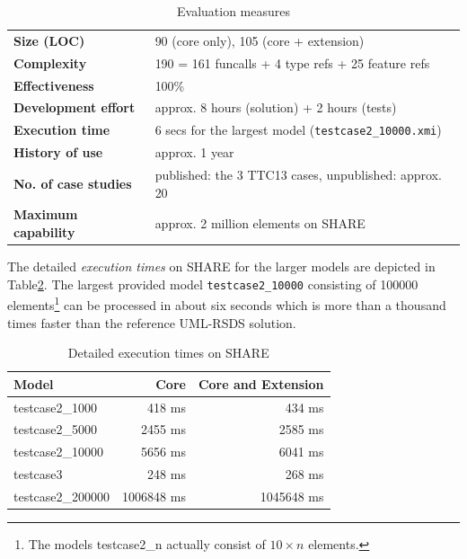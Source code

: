 \documentclass[submission]{eptcs}
\begin{document}
\begin{table}[htb]
  \footnotesize
  \centering
  \begin{tabular}{| l | l |}
    \hline
    \textbf{Size (LOC)}         & 90 (core only), 105 (core + extension)\\
    \textbf{Complexity}         & 190 = 161 funcalls + 4 type refs + 25 feature refs\\
    \textbf{Effectiveness}      & 100\%\\
    \textbf{Development effort} & approx. 8 hours (solution) + 2 hours (tests)\\
    \textbf{Execution time}     & 6 secs for the largest model (\verb|testcase2_10000.xmi|)\\
    \textbf{History of use}     & approx. 1 year\\
    \textbf{No. of case studies}& published: the 3 TTC13 cases, unpublished: approx. 20\\
    \textbf{Maximum capability} & approx. 2 million elements on SHARE\\
    \hline
  \end{tabular}
  \caption{Evaluation measures}
  \label{tab:evaluation}
\end{table}

The detailed \emph{execution times} on SHARE for the larger models are depicted
in Table\ref{tab:exec-times}.  The largest provided model
\verb|testcase2_10000| consisting of 100000 elements\footnote{The models
  \textsf{testcase2\_n} actually consist of $10\times n$ elements.} can be
processed in about six seconds which is more than a thousand times faster than
the reference UML-RSDS solution.

\begin{table}[htb]
  \footnotesize
  \centering
  \begin{tabular}{| l | r | r |}
    \hline
    \textbf{Model}    & \textbf{Core} & \textbf{Core and Extension}\\
    \hline
    \textsf{testcase2\_1000}   & 418 ms    & 434 ms\\
    \textsf{testcase2\_5000}   & 2455 ms   & 2585 ms\\
    \textsf{testcase2\_10000}  & 5656 ms   & 6041 ms\\
    \textsf{testcase3}         & 248 ms    & 268 ms\\
    \hline
    \textsf{testcase2\_200000} & 1006848 ms & 1045648 ms\\
    \hline
  \end{tabular}
  \caption{Detailed execution times on SHARE}
  \label{tab:exec-times}
\end{table}
\end{document}
